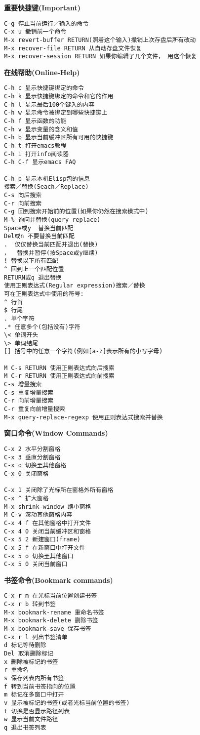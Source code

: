 \documentclass{article}
\newcommand{\xiaosi}{\fontsize{12pt}{18pt}\selectfont}            %
\begin{document}
\begin{multicols}{2}
\vspace{-9pt}
\noindent \textbf{\xiaosi 重要快捷键(Important)}
\vspace{-9pt}
\begin{verbatim}
C-g 停止当前运行／输入的命令
C-x u 撤销前一个命令
M-x revert-buffer RETURN(照着这个输入)撤销上次存盘后所有改动
M-x recover-file RETURN 从自动存盘文件恢复
M-x recover-session RETURN 如果你编辑了几个文件， 用这个恢复
\end{verbatim}
\vspace{-9pt}
\noindent \textbf{\xiaosi 在线帮助(Online-Help)}
\vspace{-9pt}
\begin{verbatim}
C-h c 显示快捷键绑定的命令
C-h k 显示快捷键绑定的命令和它的作用
C-h l 显示最后100个键入的内容
C-h w 显示命令被绑定到哪些快捷键上
C-h f 显示函数的功能
C-h v 显示变量的含义和值
C-h b 显示当前缓冲区所有可用的快捷键
C-h t 打开emacs教程
C-h i 打开info阅读器
C-h C-f 显示emacs FAQ

C-h p 显示本机Elisp包的信息
搜索／替换(Seach／Replace)
C-s 向后搜索
C-r 向前搜索
C-g 回到搜索开始前的位置(如果你仍然在搜索模式中)
M-% 询问并替换(query replace)
Space或y  替换当前匹配
Del或n 不要替换当前匹配
.  仅仅替换当前匹配并退出(替换)
，  替换并暂停(按Space或y继续)
! 替换以下所有匹配
^ 回到上一个匹配位置
RETURN或q 退出替换
使用正则表达式(Regular expression)搜索／替换
可在正则表达式中使用的符号:
^ 行首
$ 行尾
. 单个字符
.* 任意多个(包括没有)字符
\< 单词开头
\> 单词结尾
[] 括号中的任意一个字符(例如[a-z]表示所有的小写字母)

M C-s RETURN 使用正则表达式向后搜索 
M C-r RETURN 使用正则表达式向前搜索 
C-s 增量搜索
C-s 重复增量搜索
C-r 向前增量搜索
C-r 重复向前增量搜索
M-x query-replace-regexp 使用正则表达式搜索并替换
\end{verbatim}
\vspace{-9pt}
\noindent \textbf{\xiaosi 窗口命令(Window Commands)}
\vspace{-9pt}
\begin{verbatim}
C-x 2 水平分割窗格
C-x 3 垂直分割窗格
C-x o 切换至其他窗格
C-x 0 关闭窗格

C-x 1 关闭除了光标所在窗格外所有窗格
C-x ^ 扩大窗格
M-x shrink-window 缩小窗格
M C-v 滚动其他窗格内容
C-x 4 f 在其他窗格中打开文件
C-x 4 0 关闭当前缓冲区和窗格
C-x 5 2 新建窗口(frame)
C-x 5 f 在新窗口中打开文件
C-x 5 o 切换至其他窗口
C-x 5 0 关闭当前窗口
\end{verbatim}
\vspace{-9pt}
\noindent \textbf{\xiaosi 书签命令(Bookmark  commands)} 
\vspace{-9pt}
\begin{verbatim}
C-x r m 在光标当前位置创建书签 
C-x r b 转到书签
M-x bookmark-rename 重命名书签
M-x bookmark-delete 删除书签
M-x bookmark-save 保存书签
C-x r l 列出书签清单
d 标记等待删除
Del 取消删除标记
x 删除被标记的书签
r 重命名
s 保存列表内所有书签
f 转到当前书签指向的位置
m 标记在多窗口中打开
v 显示被标记的书签(或者光标当前位置的书签)
t 切换是否显示路径列表
w 显示当前文件路径
q 退出书签列表


\end{verbatim}
\end{multicols}
\end{document}
